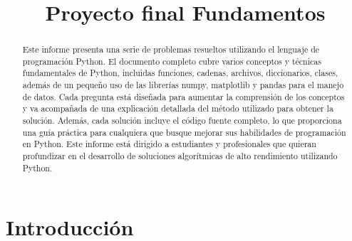\documentclass[conference]{IEEEtran}
\begin{document}
\title{\bf{Proyecto final Fundamentos}}

\author{
\and
{}
\and
{}
}

\maketitle

\begin{abstract}
Este informe presenta una serie de problemas resueltos utilizando el lenguaje de programación Python. El documento completo cubre varios conceptos y técnicas fundamentales de Python, incluidas funciones, cadenas, archivos, diccionarios, clases, además de un pequeño uso de las librerías numpy, matplotlib y pandas para el manejo de datos. Cada pregunta está diseñada para aumentar la comprensión de los conceptos y va acompañada de una explicación detallada del método utilizado para obtener la solución. Además, cada solución incluye el código fuente completo, lo que proporciona una guía práctica para cualquiera que busque mejorar sus habilidades de programación en Python. Este informe está dirigido a estudiantes y profesionales que quieran profundizar en el desarrollo de soluciones algorítmicas de alto rendimiento utilizando Python.

\vspace{0.2cm}


    
\end{abstract}

\section{Introducción}
\end{document}
